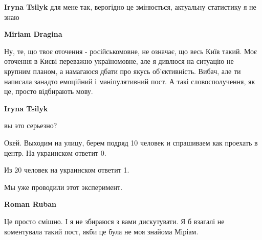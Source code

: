 \begin{itemize}
\begin{itemize}
 
\textbf{Iryna Tsilyk} для мене так, верогідно це змінюється, актуальну статистику я не знаю

 

\textbf{Miriam Dragina} 

Ну, те, що твоє оточення - російськомовне, не означає, що весь Київ такий. Моє
оточення в Києві переважно україномовне, але я дивлюся на ситуацію не крупним
планом, а намагаюся дбати про якусь об'єктивність. Вибач, але ти написала
занадто емоційний і маніпулятивний пост. А такі словосполучення, як це, просто
відбирають мову.


 
\textbf{Iryna Tsilyk} 

вы это серьезно?

Окей. Выходим на улицу, берем подряд 10 человек и спрашиваем как проехать в
центр. На украинском ответит 0.

Из 20 человек на украинском ответит 1.

Мы уже проводили этот эксперимент.


 

\textbf{Roman Ruban} 

Це просто смішно. І я не збираюся з вами дискутувати. Я б взагалі не
коментувала такий пост, якби це була не моя знайома Міріам.


 

\end{itemize}
\end{itemize}
